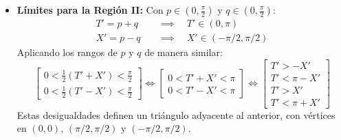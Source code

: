 \begin{itemize}
  \item \textbf{Límites para la Región II:} Con $p \in (0, \frac{\pi}{2})$ y $q \in (0, \frac{\pi}{2})$:
        \begin{align*}
          T' = p+q \quad & \implies \quad T' \in (0, \pi)        \\
          X' = p-q \quad & \implies \quad X' \in (-\pi/2, \pi/2)
        \end{align*}
        Aplicando los rangos de $p$ y $q$ de manera similar:
        \begin{equation}
          \left[\begin{array}{c}
              0 < \frac{1}{2}(T'+X') < \frac{\pi}{2} \\
              0 < \frac{1}{2}(T'-X') < \frac{\pi}{2}
            \end{array}\right] \Leftrightarrow \left[\begin{array}{c}
              0 < T'+X' < \pi \\
              0 < T'-X' < \pi
            \end{array}\right] \Leftrightarrow
          \left[\begin{array}{c}
              T' > -X'    \\
              T' < \pi-X' \\
              T' > X'     \\
              T' < \pi+X'
            \end{array}\right]
        \end{equation}
        Estas desigualdades definen un triángulo adyacente al anterior, con vértices en $(0,0)$, $(\pi/2, \pi/2)$ y $(-\pi/2, \pi/2)$.
\end{itemize}

